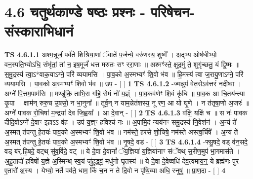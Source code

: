 \documentclass[17pt]{extarticle}
\begin{document}
     \section*{ 4.6      चतुर्थकाण्डे षष्ठः प्रश्नः - परिषेचन-संस्काराभिधानं }
                                        \textbf{ TS 4.6.1.1} \newline
                  अश्म॒न्नूर्जं॒ पर्व॑ते शिश्रिया॒णां ॅवाते॑ प॒र्जन्ये॒ वरु॑णस्य॒ शुष्मे᳚ । अ॒द्भ्य ओष॑धीभ्यो॒ वन॒स्पति॒भ्योऽधि॒ संभृ॑तां॒ तां न॒ इष॒मूर्जं॑ धत्त मरुतः सꣳ ररा॒णाः ॥ अश्मꣳ॑स्ते॒ क्षुद॒मुं ते॒ शुगृ॑च्छतु॒ यं द्वि॒ष्मः ॥ स॒मु॒द्रस्य॑ त्वा॒ऽ*वाक॒याऽग्ने॒ परि॑ व्ययामसि । पा॒व॒को अ॒स्मभ्यꣳ॑ शि॒वो भ॑व ॥ हि॒मस्य॑ त्वा ज॒रायु॒णाऽग्ने॒ परि॑ व्ययामसि । पा॒व॒को अ॒स्मभ्यꣳ॑ शि॒वो भ॑व ॥ उप॒ - [  ] \textbf{  1} \newline
                  \newline
                                \textbf{ TS 4.6.1.2} \newline
                  -ज्मन्नुप॑ वेत॒सेऽव॑त्तरं न॒दीष्वा । अग्ने॑ पि॒त्तम॒पाम॑सि ॥ मण्डू॑कि॒ ताभि॒रा ग॑हि॒ सेमं नो॑ य॒ज्ञ्ं । पा॒व॒कव॑र्णꣳ शि॒वं कृ॑धि ॥ पा॒व॒क आ चि॒तय॑न्त्या कृ॒पा । क्षाम॑न् रुरु॒च उ॒षसो॒ न भा॒नुना᳚ ॥ तूर्व॒न् न याम॒न्नेत॑शस्य॒ नू रण॒ आ यो घृ॒णे । न त॑तृषा॒णो अ॒जरः॑ ॥ अग्ने॑ पावक रो॒चिषा॑ म॒न्द्रया॑ देव जि॒ह्वया᳚ । आ दे॒वान् - [  ] \textbf{  2 } \newline
                  \newline
                                \textbf{ TS 4.6.1.3} \newline
                  व॑क्षि॒ यक्षि॑ च ॥ स नः॑ पावक दीदि॒वोऽग्ने॑ दे॒वाꣳ इ॒हाऽऽ व॑ह । उप॑ य॒ज्ञ्ꣳ ह॒विश्च॑ नः ॥ अ॒पामि॒दं न्यय॑नꣳ समु॒द्रस्य॑ नि॒वेश॑नं । अ॒न्यं ते॑ अ॒स्मत् त॑पन्तु हे॒तयः॑ पाव॒को अ॒स्मभ्यꣳ॑ शि॒वो भ॑व ॥ नम॑स्ते॒ हर॑से शो॒चिषे॒ नम॑स्ते अस्त्व॒र्चिषे᳚ । अ॒न्यं ते॑ अ॒स्मत् त॑पन्तु हे॒तयः॑ पाव॒को अ॒स्मभ्यꣳ॑ शि॒वो भ॑व ॥ नृ॒षदे॒ वड॑ - [  ] \textbf{  3} \newline
                  \newline
                                \textbf{ TS 4.6.1.4} \newline
                  -फ्सु॒षदे॒ वड् व॑न॒सदे॒ वड् ब॑र्.हि॒षदे॒ वट्थ् सु॑व॒र्विदे॒ वट् ॥ ये दे॒वा दे॒वानां᳚ ॅय॒ज्ञिया॑ य॒ज्ञिया॑नाꣳ संॅवथ् स॒रीण॒मुप॑ भा॒गमास॑ते । अ॒हु॒तादो॑ ह॒विषो॑ य॒ज्ञे अ॒स्मिन्थ् स्व॒यं जु॑हुद्ध्वं॒ मधु॑नो घृ॒तस्य॑ ॥ ये दे॒वा दे॒वेष्वधि॑ देव॒त्वमाय॒न्॒ ये ब्रह्म॑णः पुर ए॒तारो॑ अ॒स्य । येभ्यो॒ नर्ते पव॑ते॒ धाम॒ किं च॒न न ते दि॒वो न पृ॑थि॒व्या अधि॒ स्नुषु॑ ॥ प्रा॒ण॒दा - [  ] \textbf{  4} \newline
                  \newline
\end{document}
